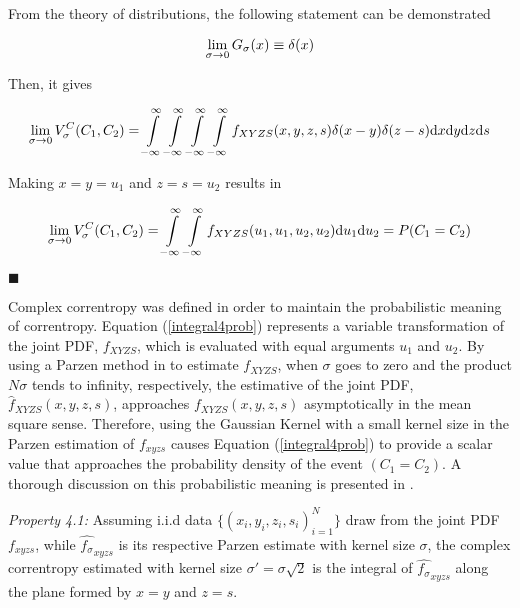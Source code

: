 \documentclass[preprint,12pt]{elsarticle}
\begin{document}
From the theory of distributions, the following statement can be demonstrated



\begin{equation}
\lim_{\sigma \rightarrow 0} G_{\sigma} (x) \equiv \delta(x)
\end{equation}


Then, it gives

\begin{equation}\label{integral4proba}
\lim_{\sigma \rightarrow 0} V^{C}_{\sigma}(C_{1}, C_{2}) = \int\limits_{-\infty}^{\infty} \int\limits_{-\infty}^{\infty} \int\limits_{-\infty}^{\infty} \int\limits_{-\infty}^{\infty} f_{XYZS}(x,y,z,s) \delta(x-y) \delta(z-s) \mathrm{d}x\mathrm{d}y \mathrm{d}z\mathrm{d}s
\end{equation}

Making $x=y=u_1$ and $z=s=u_2$ results in

\begin{equation}\label{integral4prob}
\lim_{\sigma \rightarrow 0} V^{C}_{\sigma}(C_{1}, C_{2}) = \int\limits_{-\infty}^{\infty} \int\limits_{-\infty}^{\infty} f_{XYZS}(u_1,u_1,u_2,u_2) \mathrm{d}u_1\mathrm{d}u_2 = P(C_1 = C_2)
\end{equation}

\begin{flushright}
$\blacksquare$
\end{flushright}



Complex correntropy was defined in order to maintain the probabilistic meaning of correntropy. Equation (\ref{integral4prob}) represents a variable transformation of the joint PDF, $f_{XYZS}$, which is evaluated with equal arguments $u_1$ and $u_2$. By using a Parzen method in \citep{parzen1962estimation} to estimate $f_{XYZS}$, when $\sigma$ goes to zero and the product $N \sigma$ tends to infinity, respectively, the estimative of the joint PDF, $\hat{f}_{XYZS}(x,y,z,s)$, approaches $f_{XYZS}(x,y,z,s)$ asymptotically in the mean square sense. Therefore, using the Gaussian Kernel with a small kernel size in the Parzen estimation of $f_{xyzs}$  causes Equation (\ref{integral4prob}) to provide a scalar value that approaches the probability density of the event $(C_1 = C_2)$. A thorough discussion on this probabilistic meaning is presented in \citep{7763864}.


\textit{Property 4.1:} Assuming i.i.d data $\{ ( x_i,y_i,z_i,s_i )_{i=1}^N \}$ draw from the joint PDF $f_{xyzs}$, while $\hat{f_{\sigma}}_{xyzs}$ is its respective Parzen estimate with kernel size $\sigma$, the complex correntropy estimated with kernel size $\sigma' = \sigma \sqrt{2}$ is the integral of $\hat{f_{\sigma}}_{xyzs}$ along the plane formed by $x=y$ and $z=s$. 
\end{document}
